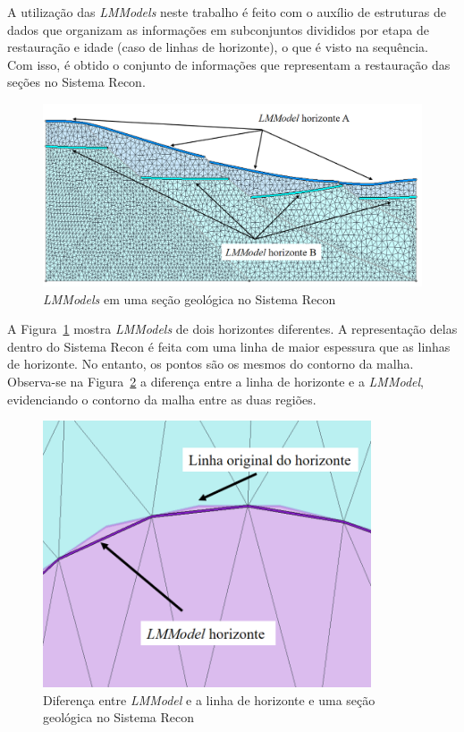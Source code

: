 A utilização das \emph{LMModels} neste trabalho é feito com o auxílio de estruturas de dados que organizam as informações em subconjuntos divididos por etapa de restauração e idade (caso de linhas de horizonte), o que é visto na sequência. Com isso, é obtido o conjunto de informações que representam a restauração das seções no Sistema Recon.

\begin{figure} [h]
  \begin{center}
    \includegraphics[width=350pt]{images/fig-lmmodel-example}
    \caption{\textit{LMModels} em uma seção geológica no Sistema Recon}\label{fig-lmmodel-example}
  \end{center}
\end{figure}

A Figura~\ref{fig-lmmodel-example} mostra \textit{LMModels} de dois horizontes diferentes. A representação delas dentro do Sistema Recon é feita com uma linha de maior espessura que as linhas de horizonte. No entanto, os pontos são os mesmos do contorno da malha. Observa-se na Figura~\ref{fig-lmmodel-mesh-diff} a diferença entre a linha de horizonte e a \textit{LMModel}, evidenciando o contorno da malha entre as duas regiões.

\begin{figure} [h!]
  \begin{center}
    \includegraphics[width=275pt]{images/fig-lmmodel-mesh-diff}
    \caption{Diferença entre \textit{LMModel} e a linha de horizonte e uma seção geológica no Sistema Recon}\label{fig-lmmodel-mesh-diff}
  \end{center}
\end{figure}

